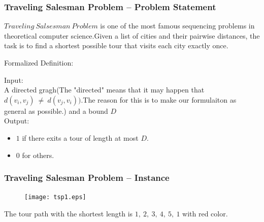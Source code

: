 \documentclass[slidestop,compress,mathserif]{beamer}
\begin{document}
\frame
{
\frametitle{Traveling Salesman Problem -- Problem Statement}
 $Traveling \ Salsesman \ Problem$ is one of the most famous sequencing problems in theoretical computer science.Given a list of cities and their pairwise distances,
the task is to find a shortest possible tour that visits each city exactly once.
\begin{block}{Formalized Definition:}

Input: \\

A directed gragh(The "directed" means that it may happen that $d(v_i,v_j) \  \neq \ d(v_j,v_i))$.The reason for this is to make our formulaiton as general as possible.) and a bound  $D$\\

Output: 
\begin{itemize}
 \item $1$ if there exits a tour of length at most $D$.
 \item $0$ for others.
\end{itemize}

\end{block}
}
\frame
{
\frametitle{Traveling Salesman Problem -- Instance}

\begin{figure}
 \texttt{[image: tsp1.eps]}
\end{figure}

The tour path with the shortest length is  $1, \ 2, \ 3, \ 4, \ 5, \ 1$ with red color. 

}
\end{document}

